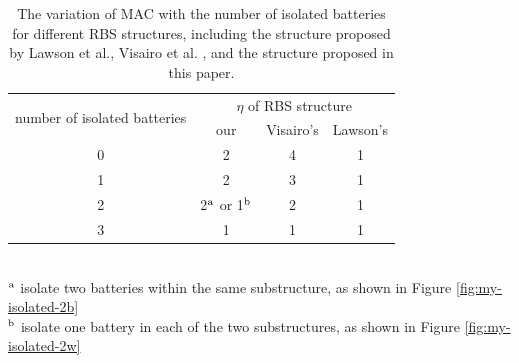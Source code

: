 \documentclass{article}
\begin{document}
\begin{table}[htbp]
    \centering
    \caption{
      The variation of MAC with the number of isolated batteries for different RBS structures, including the structure proposed by Lawson et al., Visairo et al. , and the structure proposed in this paper.
      }
      \label{tab:isolated_mac}
      \begin{tabular}{cccc}
      \toprule
      \multirow{2}[4]{*}{number of isolated batteries} & \multicolumn{3}{c}{$\eta$ of RBS structure} \\
  \cmidrule{2-4}          & our  & Visairo's  & Lawson's  \\
      \midrule
      0     & 2     & 4     & 1 \\
      1     & 2     & 3     & 1 \\
      2     & 2$^{\rm a}$ or 1$^{\rm b}$ & 2     & 1 \\
      3     & 1     & 1     & 1 \\
      \bottomrule
      \end{tabular}
      \\
      \footnotesize{$^{\rm a}$ isolate two batteries within the same substructure, as shown in Figure \ref{fig:my-isolated-2b}}\\
      \footnotesize{$^{\rm b}$ isolate one battery in each of the two substructures, as shown in Figure \ref{fig:my-isolated-2w}}
  \end{table}
  
\end{document}
